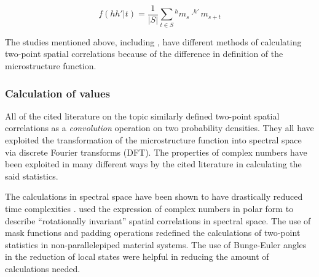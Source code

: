\[
  f(hh'\lvert t) = \dfrac{1}{\lvert S\rvert}\sum_{t \in S} {^hm_s} \cdot ^{h'}m_{s+t}
\]

The studies mentioned above, including , have different methods of calculating two-point spatial correlations because of the difference in definition of the microstructure function.

\subsubsection{Calculation of values}

All of the cited literature on the topic similarly defined two-point spatial correlations as a \emph{convolution} operation on two probability densities.
They all have exploited the transformation of the microstructure function into spectral space via discrete Fourier transforms (DFT).
The properties of complex numbers have been exploited in many different ways by the cited literature in calculating the said statistics.

The calculations in spectral space have been shown to have drastically reduced time complexities \cite{delin}.
 used the expression of complex numbers in polar form to describe ``rotationally invariant'' spatial correlations in spectral space.
The use of mask functions and padding operations \cite{sun17} redefined the calculations of two-point statistics in non-parallelepiped material systems.
The use of Bunge-Euler angles in the reduction of local states \cite{bunge, yabansu14} were helpful in reducing the amount of calculations needed.
